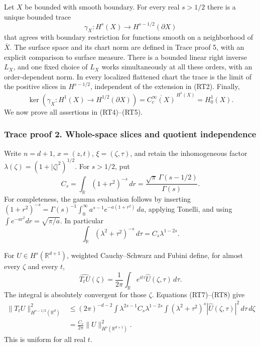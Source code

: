 \documentclass[
  11pt,
]{article}
\makeatletter
\let\ReaderOriginalAnchorStart\hyper@anchorstart
\let\ReaderOriginalAnchorEnd\hyper@anchorend
\let\ReaderPendingAliases\@empty
\def\ReaderArmAliases#1{\gdef\ReaderPendingAliases{#1}}
\def\hyper@anchorstart#1{\ReaderIfNativeAnchorTF{#1}{\ReaderPendingAliases\global\let\ReaderPendingAliases\@empty}{}\ReaderOriginalAnchorStart{#1}}
\makeatother
\begin{document}
Let \(X\) be bounded with smooth boundary. For every real \(s>1/2\)
there is a unique bounded trace \[
 \gamma_X:H^s(X)\longrightarrow H^{s-1/2}(\partial X)
 \tag{RT4}
\] that agrees with boundary restriction for functions smooth on a
neighborhood of \(\overline X\). The surface space and its chart norm
are defined in Trace proof 5, with an explicit comparison to surface
measure. There is a bounded linear right inverse \(L_X\), and one fixed
choice of \(L_X\) works simultaneously at all these orders, with an
order-dependent norm. In every localized flattened chart the trace is
the limit of the positive slices in \(H^{s-1/2}\), independent of the
extension in (RT2). Finally, \[
 \ker(\gamma_X:H^1(X)\to H^{1/2}(\partial X))
 =\overline{C_c^\infty(X)}^{\,H^1(X)}=H_0^1(X).
 \tag{RT5}
\] We now prove all assertions in (RT4)--(RT5).

\ReaderArmAliases{\ReaderOriginalAnchorStart{trace-proof-2-whole-space-slices-and-quotient-independence}\ReaderOriginalAnchorEnd\begingroup\expandafter\def\csname @currentHref\endcsname{trace-proof-2-whole-space-slices-and-quotient-independence}\label{trace-proof-2-whole-space-slices-and-quotient-independence}\endgroup\ReaderOriginalAnchorStart{trace-proof-2.-whole-space-slices-and-quotient-independence}\ReaderOriginalAnchorEnd}
\subsubsection{Trace proof 2. Whole-space slices and quotient
independence}\label{trace-proof-2.-whole-space-slices-and-quotient-independence}

Write \(n=d+1\), \(x=(z,t)\), \(\xi=(\zeta,\tau)\), and retain the
inhomogeneous factor \(\lambda(\zeta)=(1+|\zeta|^2)^{1/2}\). For
\(s>1/2\), put \[
 C_s=\int_{\mathbb R}(1+r^2)^{-s}\,dr
 =\frac{\sqrt\pi\,\Gamma(s-1/2)}{\Gamma(s)}.
 \tag{RT6}
\] For completeness, the gamma evaluation follows by inserting
\((1+r^2)^{-s}=\Gamma(s)^{-1}\int_0^\infty a^{s-1}e^{-a(1+r^2)}\,da\),
applying Tonelli, and using \(\int e^{-ar^2}dr=\sqrt{\pi/a}\). In
particular \[
 \int_{\mathbb R}(\lambda^2+\tau^2)^{-s}\,d\tau
 =C_s\lambda^{1-2s}.
 \tag{RT7}
\]

For \(U\in H^s(\mathbb R^{d+1})\), weighted Cauchy--Schwarz and Fubini
define, for almost every \(\zeta\) and every \(t\), \[
 \widehat{T_tU}(\zeta)
 =\frac1{2\pi}\int_{\mathbb R}e^{it\tau}\widehat U(\zeta,\tau)\,d\tau.
 \tag{RT8}
\] The integral is absolutely convergent for those \(\zeta\). Equations
(RT7)--(RT8) give \[
\begin{aligned}
 \|T_tU\|_{H^{s-1/2}(\mathbb R^d)}^2
 &\leq (2\pi)^{-d-2}\int \lambda^{2s-1}
 C_s\lambda^{1-2s}
 \int(\lambda^2+\tau^2)^s|\widehat U(\zeta,\tau)|^2\,d\tau\,d\zeta\\
 &=\frac{C_s}{2\pi}\|U\|_{H^s(\mathbb R^{d+1})}^2.
\end{aligned}
 \tag{RT9}
\] This is uniform for all real \(t\).
\end{document}
